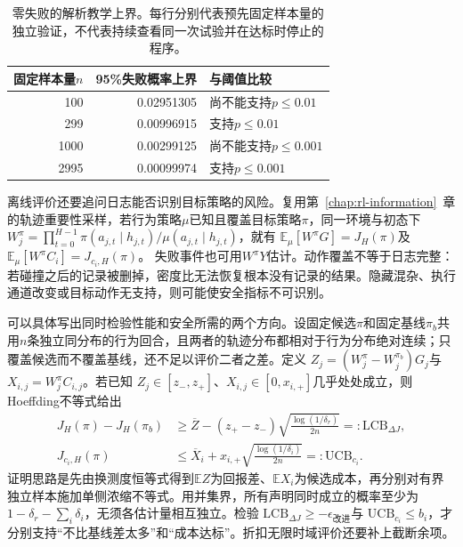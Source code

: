\begin{table}[htbp]
  \centering
  \begin{tabular}{@{}rrl@{}}
    \toprule
    固定样本量$n$ & 95\%失败概率上界 & 与阈值比较 \\
    \midrule
    100  & 0.02951305 & 尚不能支持$p\leq0.01$ \\
    299  & 0.00996915 & 支持$p\leq0.01$ \\
    1000 & 0.00299125 & 尚不能支持$p\leq0.001$ \\
    2995 & 0.00099974 & 支持$p\leq0.001$ \\
    \bottomrule
  \end{tabular}
  \caption{零失败的解析教学上界。每行分别代表预先固定样本量的独立验证，不代表持续查看同一次试验并在达标时停止的程序。}
  \label{tab:rl-trustworthy-zero-failure}
\end{table}

离线评价还要追问日志能否识别目标策略的风险。复用第~\ref{chap:rl-information}~章的轨迹重要性采样，若行为策略$\mu$已知且覆盖目标策略$\pi$，同一环境与初态下
$W_j^\pi=\prod_{t=0}^{H-1}\pi(a_{j,t}\mid h_{j,t})/
\mu(a_{j,t}\mid h_{j,t})$，就有
$\mathbb E_\mu[W^\pi G]=J_H(\pi)$及
$\mathbb E_\mu[W^\pi C_i]=J_{c_i,H}(\pi)$。
失败事件也可用$W^\pi Y$估计。动作覆盖不等于日志完整：若碰撞之后的记录被删掉，密度比无法恢复根本没有记录的结果。隐藏混杂、执行通道改变或目标动作无支持，则可能使安全指标不可识别。

可以具体写出同时检验性能和安全所需的两个方向。设固定候选$\pi$和固定基线$\pi_b$共用$n$条独立同分布的行为回合，且两者的轨迹分布都相对于行为分布绝对连续；只覆盖候选而不覆盖基线，还不足以评价二者之差。定义
$Z_j=(W_j^\pi-W_j^{\pi_b})G_j$与
$X_{i,j}=W_j^\pi C_{i,j}$。若已知
$Z_j\in[z_-,z_+]$、$X_{i,j}\in[0,x_{i,+}]$几乎处处成立，则Hoeffding不等式给出
\begin{align}
  J_H(\pi)-J_H(\pi_b)
     &\geq \overline Z
        -(z_+-z_-)\sqrt{\frac{\log(1/\delta_r)}{2n}}
        =:\mathrm{LCB}_{\Delta J}, \nonumber\\
  J_{c_i,H}(\pi)
     &\leq \overline X_i
        +x_{i,+}\sqrt{\frac{\log(1/\delta_i)}{2n}}
        =:\mathrm{UCB}_{c_i}.
  \label{eq:rl-trustworthy-offline-joint}
\end{align}
证明思路是先由换测度恒等式得到$\mathbb E Z$为回报差、$\mathbb E X_i$为候选成本，再分别对有界独立样本施加单侧浓缩不等式。用并集界，所有声明同时成立的概率至少为
$1-\delta_r-\sum_i\delta_i$，无须各估计量相互独立。检验
$\mathrm{LCB}_{\Delta J}\geq-\epsilon_{\text{改进}}$与
$\mathrm{UCB}_{c_i}\leq b_i$，才分别支持“不比基线差太多”和“成本达标”。折扣无限时域评价还要补上截断余项。

